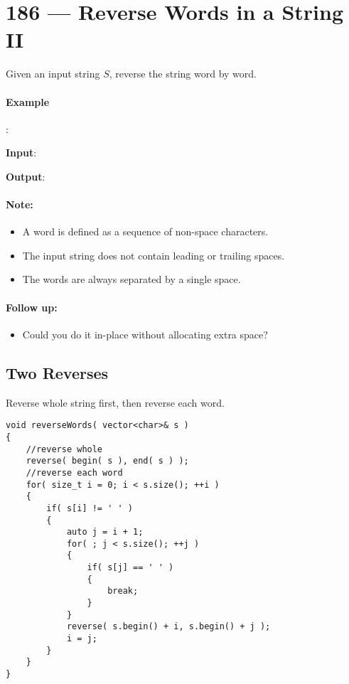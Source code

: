 \section{186 --- Reverse Words in a String II}
Given an input string $S$, reverse the string word by word. 
\par
\paragraph{Example}:
\begin{flushleft}
\textbf{Input}: 

\textbf{Output}: 
\end{flushleft}
\paragraph{Note: }

\begin{itemize}
\item A word is defined as a sequence of non-space characters.
\item The input string does not contain leading or trailing spaces.
\item The words are always separated by a single space.
\end{itemize}
\paragraph{Follow up:} 
\begin{itemize}
\item Could you do it in-place without allocating extra space?
\end{itemize}

\subsection{Two Reverses}
Reverse whole string first, then reverse each word.

\setcounter{lstlisting}{0}
\begin{lstlisting}[style=customc, caption={Two Reverses}]
void reverseWords( vector<char>& s )
{
    //reverse whole
    reverse( begin( s ), end( s ) );
    //reverse each word
    for( size_t i = 0; i < s.size(); ++i )
    {
        if( s[i] != ' ' )
        {
            auto j = i + 1;
            for( ; j < s.size(); ++j )
            {
                if( s[j] == ' ' )
                {
                    break;
                }
            }
            reverse( s.begin() + i, s.begin() + j );
            i = j;
        }
    }
}
\end{lstlisting}